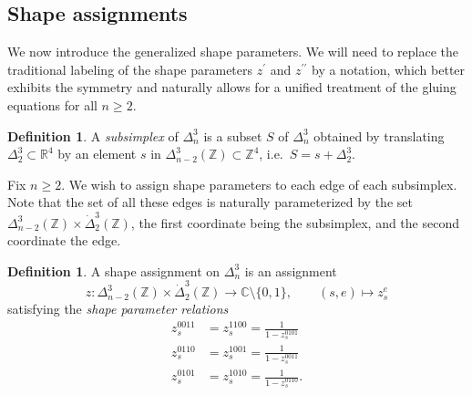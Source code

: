 \documentclass[12pt]{amsart}
\theoremstyle{definition}
\newtheorem{definition}[theorem]{Definition}
\newtheorem{remark}[theorem]{Remark}
\numberwithin{equation}{section}
\def\R{\mathbb{R}}
\def\Z{\mathbb{Z}}
\def\C{\mathbb{C}}
\def\T{\mathcal{T}}
\begin{document}
\subsection{Shape assignments}
We now introduce the generalized shape parameters. We will need to replace the traditional labeling of the shape parameters $z^\prime$ and $z^{\prime\prime}$ by a notation, which better exhibits the symmetry and naturally allows for a unified treatment of the gluing equations for all $n\geq 2$. 


\begin{definition}\label{def:Subsimplex}
A \emph{subsimplex} of $\Delta^3_n$ is a subset $S$ of $\Delta^3_n$ obtained by translating $\Delta^3_2\subset\R^4$ by an element $s$ in $\Delta^3_{n-2}(\Z)\subset\Z^4$, i.e.~$S=s+\Delta^3_2$.
\end{definition}

Fix $n\geq 2$. %
We wish to assign shape parameters to each edge of each subsimplex. Note that the set of all these edges is naturally parameterized by the set $\Delta^3_{n-2}(\Z)\times\dot{\Delta}^3_2(\Z)$, the first coordinate being the subsimplex, and the second coordinate the edge. 


\begin{definition}\label{shapeassignment}
A shape assignment on $\Delta^3_n$ is an assignment 
\begin{equation}
z\colon\Delta^3_{n-2}(\Z)\times \dot{\Delta}^3_2(\Z)\to\C\setminus\{0,1\}, \qquad (s,e)\mapsto z^e_s
\end{equation}
satisfying the \emph{shape parameter relations}
\begin{subequations}
\label{eqn:shapeparamrel}
\begin{align}
z^{0011}_s&=z^{1100}_s=\frac{1}{1-z^{0101}_s}\label{shapepar1}\\
z^{0110}_s&=z^{1001}_s=\frac{1}{1-z^{0011}_s}\label{shapepar2}\\
z^{0101}_s&=z^{1010}_s=\frac{1}{1-z^{0110}_s}\label{shapepar3}.
\end{align}
\end{subequations}
\end{definition}

\end{document}
